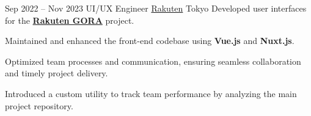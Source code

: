 \cventry
{Sep 2022 – Nov 2023}
{UI/UX Engineer}
{\href{https://global.rakuten.com/corp/}{Rakuten}}
{Tokyo}
{}
{Developed user interfaces for the \href{https://gora.golf.rakuten.co.jp/}{\textbf{Rakuten GORA}} project.}

\cvlistitem
{Maintained and enhanced the front-end codebase using \textbf{Vue.js} and \textbf{Nuxt.js}.}

\cvlistitem
{Optimized team processes and communication, ensuring seamless collaboration and timely project delivery.}

\cvlistitem
{Introduced a custom utility to track team performance by analyzing the main project repository.}
